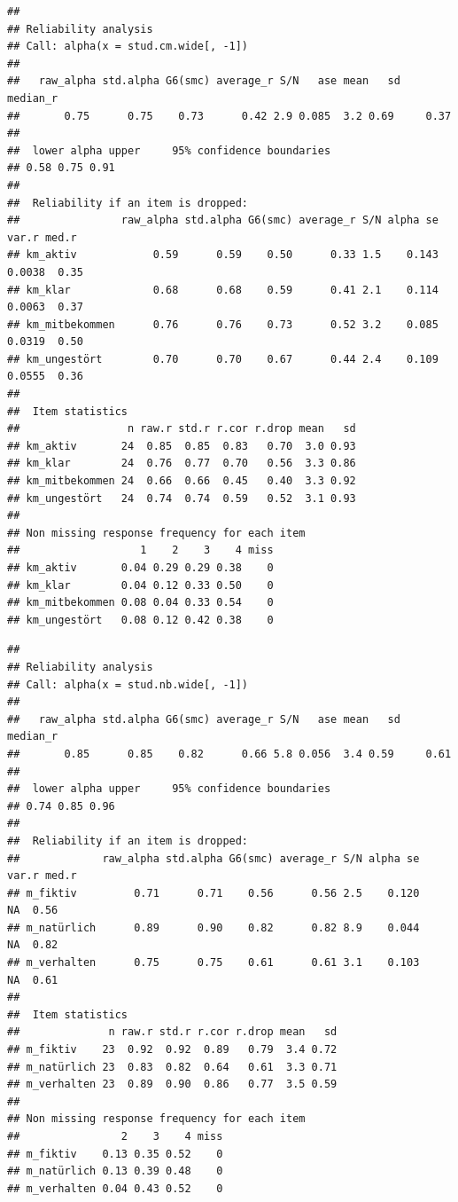 \documentclass[
  english,
  man,floatsintext]{apa6}
\begin{document}
\begin{verbatim}
## 
## Reliability analysis   
## Call: alpha(x = stud.cm.wide[, -1])
## 
##   raw_alpha std.alpha G6(smc) average_r S/N   ase mean   sd median_r
##       0.75      0.75    0.73      0.42 2.9 0.085  3.2 0.69     0.37
## 
##  lower alpha upper     95% confidence boundaries
## 0.58 0.75 0.91 
## 
##  Reliability if an item is dropped:
##                raw_alpha std.alpha G6(smc) average_r S/N alpha se  var.r med.r
## km_aktiv            0.59      0.59    0.50      0.33 1.5    0.143 0.0038  0.35
## km_klar             0.68      0.68    0.59      0.41 2.1    0.114 0.0063  0.37
## km_mitbekommen      0.76      0.76    0.73      0.52 3.2    0.085 0.0319  0.50
## km_ungestört        0.70      0.70    0.67      0.44 2.4    0.109 0.0555  0.36
## 
##  Item statistics 
##                 n raw.r std.r r.cor r.drop mean   sd
## km_aktiv       24  0.85  0.85  0.83   0.70  3.0 0.93
## km_klar        24  0.76  0.77  0.70   0.56  3.3 0.86
## km_mitbekommen 24  0.66  0.66  0.45   0.40  3.3 0.92
## km_ungestört   24  0.74  0.74  0.59   0.52  3.1 0.93
## 
## Non missing response frequency for each item
##                   1    2    3    4 miss
## km_aktiv       0.04 0.29 0.29 0.38    0
## km_klar        0.04 0.12 0.33 0.50    0
## km_mitbekommen 0.08 0.04 0.33 0.54    0
## km_ungestört   0.08 0.12 0.42 0.38    0
\end{verbatim}

\begin{verbatim}
## 
## Reliability analysis   
## Call: alpha(x = stud.nb.wide[, -1])
## 
##   raw_alpha std.alpha G6(smc) average_r S/N   ase mean   sd median_r
##       0.85      0.85    0.82      0.66 5.8 0.056  3.4 0.59     0.61
## 
##  lower alpha upper     95% confidence boundaries
## 0.74 0.85 0.96 
## 
##  Reliability if an item is dropped:
##             raw_alpha std.alpha G6(smc) average_r S/N alpha se var.r med.r
## m_fiktiv         0.71      0.71    0.56      0.56 2.5    0.120    NA  0.56
## m_natürlich      0.89      0.90    0.82      0.82 8.9    0.044    NA  0.82
## m_verhalten      0.75      0.75    0.61      0.61 3.1    0.103    NA  0.61
## 
##  Item statistics 
##              n raw.r std.r r.cor r.drop mean   sd
## m_fiktiv    23  0.92  0.92  0.89   0.79  3.4 0.72
## m_natürlich 23  0.83  0.82  0.64   0.61  3.3 0.71
## m_verhalten 23  0.89  0.90  0.86   0.77  3.5 0.59
## 
## Non missing response frequency for each item
##                2    3    4 miss
## m_fiktiv    0.13 0.35 0.52    0
## m_natürlich 0.13 0.39 0.48    0
## m_verhalten 0.04 0.43 0.52    0
\end{verbatim}
\end{document}
